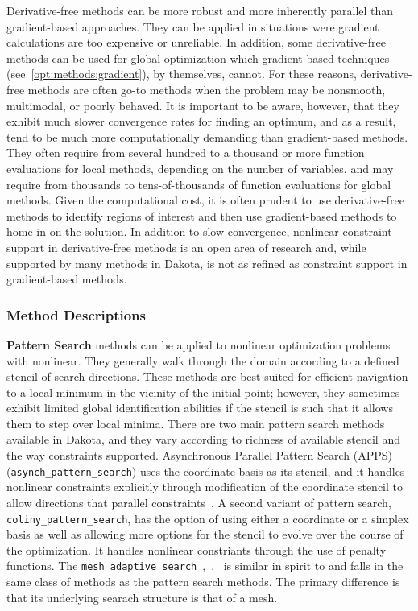 Derivative-free methods can be more robust and more inherently
parallel than gradient-based approaches. They can be applied in
situations were gradient calculations are too expensive or
unreliable. In addition, some derivative-free methods can be used for
global optimization which gradient-based techniques
(see~\ref{opt:methods:gradient}), by themselves,
cannot. For these reasons, derivative-free methods are often go-to
methods when the problem may be nonsmooth, multimodal, or poorly
behaved.  It is important to be aware, however, that they exhibit much
slower convergence rates for finding an optimum, and as a result, tend
to be much more computationally demanding than gradient-based
methods. They often require from several hundred to a thousand or more
function evaluations for local methods, depending on the number of
variables, and may require from thousands to tens-of-thousands of
function evaluations for global methods. Given the computational cost,
it is often prudent to use derivative-free methods to identify regions
of interest and then use gradient-based methods to home in on the
solution.  In addition to slow convergence, nonlinear constraint
support in derivative-free methods is an open area of research and,
while supported by many methods in Dakota, is not as refined as
constraint support in gradient-based methods.

\subsubsection{Method Descriptions}
\label{opt:methods:gradientfree:local:descriptions}

{\bf Pattern Search} methods can be applied to nonlinear optimization
problems with nonlinear.  They generally walk through the domain
according to a defined stencil of search directions.  These methods
are best suited for efficient navigation to a local minimum in the
vicinity of the initial point; however, they sometimes exhibit limited
global identification abilities if the stencil is such that it allows
them to step over local minima.  There are two main pattern search
methods available in Dakota, and they vary according to richness of
available stencil and the way constraints supported.  Asynchronous
Parallel Pattern Search (APPS)~\cite{GrKo06}
(\texttt{asynch\_pattern\_search}) uses the coordinate basis as its
stencil, and it handles nonlinear constraints explicitly through
modification of the coordinate stencil to allow directions that
parallel constraints~\cite{GrKo07}.  A second variant of pattern
search, \texttt{coliny\_pattern\_search}, has the option of using
either a coordinate or a simplex basis as well as allowing more
options for the stencil to evolve over the course of the optimization.
It handles nonlinear constriants through the use of penalty functions.
The
\texttt{mesh\_adaptive\_search}~\cite{AuLeTr09a},~\cite{Nomad},~\cite{Le2011a}
is similar in spirit to and falls in the same class of methods as the
pattern search methods.  The primary difference is that its underlying
searach structure is that of a mesh.

